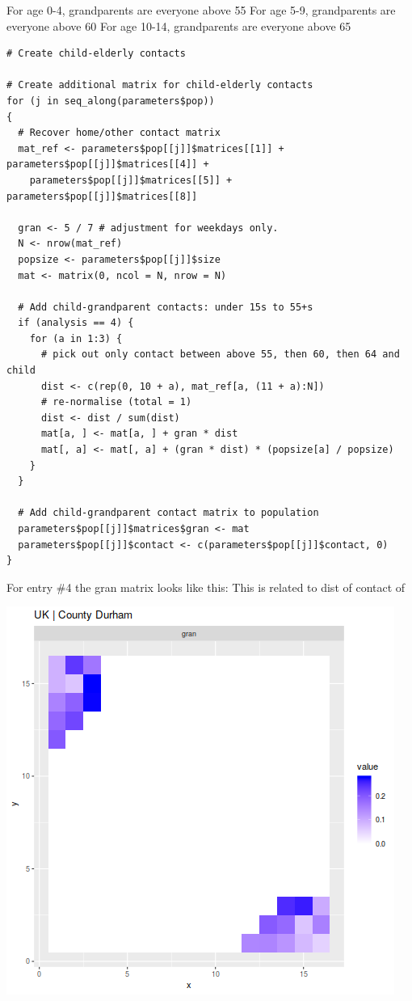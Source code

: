\documentclass[11pt]{article}
\begin{document}
For age 0-4, grandparents are everyone above 55
For age 5-9, grandparents are everyone above 60
For age 10-14, grandparents are everyone above 65
\begin{verbatim}
# Create child-elderly contacts

# Create additional matrix for child-elderly contacts
for (j in seq_along(parameters$pop))
{
  # Recover home/other contact matrix
  mat_ref <- parameters$pop[[j]]$matrices[[1]] + parameters$pop[[j]]$matrices[[4]] +
    parameters$pop[[j]]$matrices[[5]] + parameters$pop[[j]]$matrices[[8]]

  gran <- 5 / 7 # adjustment for weekdays only.
  N <- nrow(mat_ref)
  popsize <- parameters$pop[[j]]$size
  mat <- matrix(0, ncol = N, nrow = N)

  # Add child-grandparent contacts: under 15s to 55+s
  if (analysis == 4) {
    for (a in 1:3) {
      # pick out only contact between above 55, then 60, then 64 and child
      dist <- c(rep(0, 10 + a), mat_ref[a, (11 + a):N])
      # re-normalise (total = 1)
      dist <- dist / sum(dist)
      mat[a, ] <- mat[a, ] + gran * dist
      mat[, a] <- mat[, a] + (gran * dist) * (popsize[a] / popsize)
    }
  }

  # Add child-grandparent contact matrix to population
  parameters$pop[[j]]$matrices$gran <- mat
  parameters$pop[[j]]$contact <- c(parameters$pop[[j]]$contact, 0)
}
\end{verbatim}

For entry \#4 the gran matrix looks like this:
This is related to dist of contact of 

\begin{center}
\includegraphics[width=.9\linewidth]{1-home-parameters-after-split-and-gran.png}
\end{center}
\end{document}
